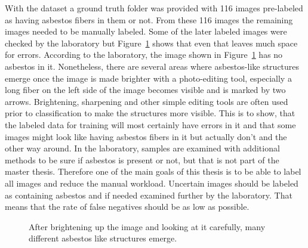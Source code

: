 With the dataset a ground truth folder was provided with 116 images pre-labeled as having asbestos fibers in them or not. From these 116 images the remaining images needed to be manually labeled. Some of the later labeled images were checked by the laboratory but Figure~\ref{fig:wrong_asbestos_labeling} shows that even that leaves much space for errors.  According to the laboratory, the image shown in Figure~\ref{fig:wrong_asbestos_labeling} has no asbestos in it. Nonetheless, there are several areas where asbestos-like structures emerge once the image is made brighter with a photo-editing tool, especially a long fiber on the left side of the image becomes visible and is marked by two arrows. Brightening, sharpening and other simple editing tools are often used prior to classification to make the structures more visible. This is to show, that the labeled data for training will most certainly have errors in it and that some images might look like having asbestos fibers in it but actually don't and the other way around. In the laboratory, samples are examined with additional methods to be sure if asbestos is present or not, but that is not part of the master thesis. Therefore one of the main goals of this thesis is to be able to label all images and reduce the manual workload. Uncertain images should be labeled as containing asbestos and if needed examined further by the laboratory. That means that the rate of false negatives should be as low as possible.

\begin{figure}[h]
\centering
\caption{After brightening up the image and looking at it carefully, many different asbestos like structures emerge.}
\label{fig:wrong_asbestos_labeling}
\end{figure}

